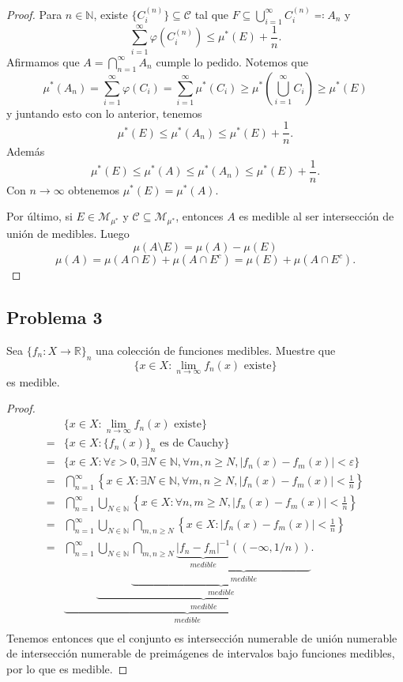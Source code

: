\documentclass{article}
\theoremstyle{definition}
\theoremstyle{remark}
\numberwithin{equation}{section}
\newcommand{\M}{\mathcal{M}}
\newcommand{\N}{\mathbb{N}}
\newcommand{\R}{\mathbb{R}}
\newcommand{\Ccal}{\mathcal{C}}
\newcommand{\e}{\varepsilon}
\newcommand{\vphi}{\varphi}
\newcommand{\oo}{\infty}
\newcommand{\abs}[1]{\left| #1 \right|}
\newcommand{\br}[1]{\left( #1 \right)}
\newcommand{\set}[1]{\left\{ #1 \right\}}
\newcommand{\rac}[2]{\frac{#1}{#2}}
\renewcommand{\o}{\to}
\begin{document}
\begin{proof}
  Para $n \in \N$, existe $\{C_i^{(n)}\} \subseteq \Ccal$ tal que $F \subseteq \bigcup_{i=1}^\oo C_i^{(n)} \eqqcolon A_n$ y 
  \[ \sum_{i=1}^\oo \vphi(C_i^{(n)}) \leq \mu^*(E) + \frac{1}{n}. \]
  Afirmamos que $A = \bigcap_{n=1}^\oo A_n$ cumple lo pedido.
  Notemos que 
  \[ \mu^*(A_n) = \sum_{i=1}^\oo \vphi(C_i) = \sum_{i=1}^\oo \mu^*(C_i) \geq \mu^*\br{\bigcup_{i=1}^\oo C_i} \geq \mu^*(E) \]
  y juntando esto con lo anterior, tenemos 
  \[ \mu^*(E) \leq \mu^*(A_n) \leq \mu^*(E) + \frac1n. \]
  Además 
  \[ \mu^*(E) \leq \mu^*(A) \leq \mu^*(A_n) \leq \mu^*(E) + \frac{1}{n}. \]
  Con $n \to \oo$ obtenemos $\mu^*(E) = \mu^*(A)$.

  Por último, si $E \in \M_{\mu^*}$ y $\Ccal \subseteq \M_{\mu^*}$, entonces $A$ es medible al ser intersección de unión de medibles. Luego
  \[ \mu(A \setminus E) = \mu(A) - \mu(E) \]
  \[ \mu(A) = \mu(A \cap E) + \mu(A \cap E^c) = \mu(E) + \mu(A \cap E^c). \]
\end{proof}

\newpage
\subsection{Problema 3}
Sea $\{f_n \colon X \o \R\}_n$ una colección de funciones medibles. Muestre que 
\[ \{x \in X \colon \lim_{n\to\oo} f_n(x) \text{ existe}\} \]
es medible.

\begin{proof}
  
  \begin{align*}
      &\{x \in X \colon \lim_{n\to\oo} f_n(x) \text{ existe}\} \\
      = &\{x \in X \colon \{f_n(x)\}_n \text{ es de Cauchy}\} \\
      = &\{x \in X \colon \forall \e>0, \exists N \in \N, \forall m,n \geq N, \abs{f_n(x) - f_m(x)} < \e\} \\
      = &\bigcap_{n=1}^\oo \set{x \in X \colon \exists N \in \N, \forall m,n \geq N, \abs{f_n(x) - f_m(x)} < \frac{1}{n}} \\
      = &\bigcap_{n=1}^\oo \bigcup_{N \in \N} \set{x \in X \colon \forall n,m \geq N, \abs{f_n(x) - f_m(x)} < \rac{1}{n}} \\
      = &\bigcap_{n=1}^\oo \bigcup_{N \in \N} \bigcap_{m,n \geq N} \set{x \in X \colon \abs{f_n(x) - f_m(x)} < \frac{1}{n}} \\
      = &\underbrace{\bigcap_{n=1}^\oo \underbrace{\bigcup_{N \in \N} \underbrace{\bigcap_{m,n \geq N} \underbrace{\underbrace{\abs{f_n - f_m}^{-1}}_{medible}((-\oo,1/n))}_{medible}}_{medible}}_{medible}}_{medible}. \\
  \end{align*}
  Tenemos entonces que el conjunto es intersección numerable de unión numerable de intersección numerable de preimágenes de intervalos bajo funciones medibles, por lo que es medible.
\end{proof}
\end{document}

